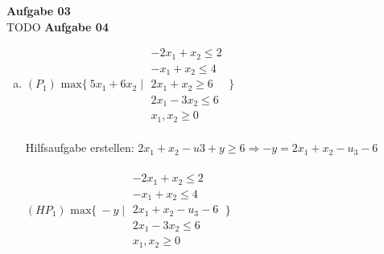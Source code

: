 \documentclass[a4paper,10pt]{article}
\begin{document}
	\parindent0pt
	\textbf{Aufgabe 03}\\
	TODO
	\newpage
	\textbf{Aufgabe 04}\\
	\begin{enumerate}[a)]
		\item 
		$ (P_1) \text{ max} \{\ 5x_1 + 6x_2 \mid \begin{matrix}
		-2x_1 + x_2 \leq 2\\
		-x_1 + x_2 \leq 4\\
		2x_1 + x_2 \geq 6\\
		2x_1 - 3x_2 \leq 6\\
		x_1, x_2 \geq 0
		\end{matrix}
		\ \} $\\\\
		Hilfsaufgabe erstellen: $2x_1 + x_2 -u3 + y \geq 6 \Rightarrow -y = 2x_1 + x_2 -u_3 - 6$\\\\
		$ (HP_1) \text{ max} \{\ -y \mid \begin{matrix}
		-2x_1 + x_2 \leq 2\\
		-x_1 + x_2 \leq 4\\
		2x_1 + x_2 -u_3 - 6\\
		2x_1 - 3x_2 \leq 6\\
		x_1, x_2 \geq 0
		\end{matrix}
		\ \} $
		

\end{enumerate}
\end{document}
